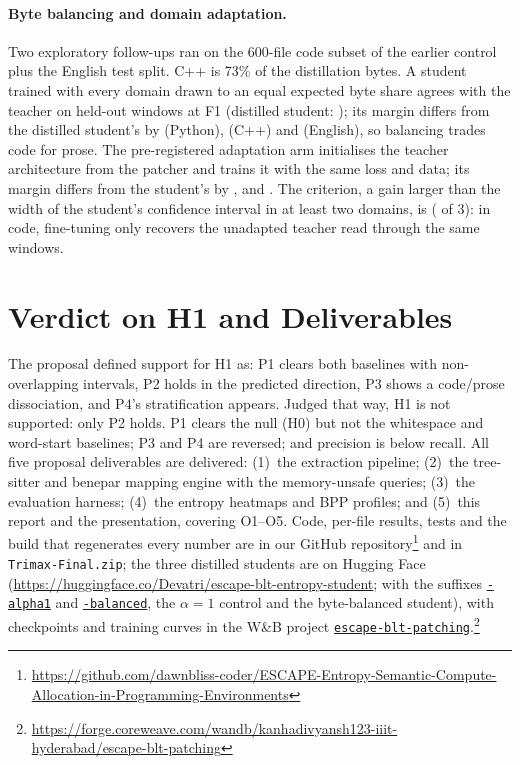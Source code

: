 \paragraph{Byte balancing and domain adaptation.} Two exploratory follow-ups ran on the 600-file code subset of the earlier control plus the English test split. C++ is 73\% of the distillation bytes. A student trained with every domain drawn to an equal expected byte share agrees with the teacher on held-out windows at F1 \xBalWinFone{} (distilled student: \xBalRefWinFone{}); its margin differs from the distilled student's by \xBalDiffPy{} \mbox{\xBalDiffCIPy{}} (Python), \xBalDiffCpp{} \mbox{\xBalDiffCICpp{}} (C++) and \xBalDiffEn{} \mbox{\xBalDiffCIEn{}} (English), so balancing trades code for prose. The pre-registered adaptation arm initialises the teacher architecture from the patcher and trains it with the same loss and data; its margin differs from the student's by \xAdaptDiffPy{} \mbox{\xAdaptDiffCIPy{}}, \xAdaptDiffCpp{} \mbox{\xAdaptDiffCICpp{}} and \xAdaptDiffEn{} \mbox{\xAdaptDiffCIEn{}}. The criterion, a gain larger than the width of the student's confidence interval in at least two domains, is \xAdaptVerdict{} (\xAdaptWins{} of 3): in code, fine-tuning only recovers the unadapted teacher read through the same windows.

\section{Verdict on H1 and Deliverables}
{\sloppy The proposal defined support for H1 as: P1 clears both baselines with non-overlapping intervals, P2 holds in the predicted direction, P3 shows a code/prose dissociation, and P4's stratification appears. Judged that way, H1 is not supported: only P2 holds. P1 clears the null (H0) but not the whitespace and word-start baselines; P3 and P4 are reversed; and precision is below recall. All five proposal deliverables are delivered: (1)~the extraction pipeline; (2)~the tree-sitter and benepar mapping engine with the memory-unsafe queries; (3)~the evaluation harness; (4)~the entropy heatmaps and BPP profiles; and (5)~this report and the presentation, covering O1--O5. Code, per-file results, tests and the build that regenerates every number are in our GitHub repository\footnote{\url{https://github.com/dawnbliss-coder/ESCAPE-Entropy-Semantic-Compute-Allocation-in-Programming-Environments}} and in \texttt{Trimax-Final.zip}; the three distilled students are on Hugging Face (\url{https://huggingface.co/Devatri/escape-blt-entropy-student}; with the suffixes \href{https://huggingface.co/Devatri/escape-blt-entropy-student-alpha1}{\texttt{-alpha1}} and \href{https://huggingface.co/Devatri/escape-blt-entropy-student-balanced}{\texttt{-balanced}}, the $\alpha{=}1$ control and the byte-balanced student), with checkpoints and training curves in the W\&B project \href{https://forge.coreweave.com/wandb/kanhadivyansh123-iiit-hyderabad/escape-blt-patching}{\texttt{escape-blt-patching}}.\footnote{\url{https://forge.coreweave.com/wandb/kanhadivyansh123-iiit-hyderabad/escape-blt-patching}}}


